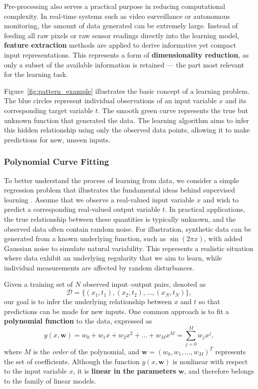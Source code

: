 \documentclass[12pt]{article}
\begin{document}
Pre-processing also serves a practical purpose in reducing computational complexity. 
In real-time systems such as video surveillance or autonomous monitoring, the amount of data generated can be extremely large. 
Instead of feeding all raw pixels or raw sensor readings directly into the learning model, \textbf{feature extraction} methods are applied to derive informative yet compact input representations. 
This represents a form of \textbf{dimensionality reduction}, as only a subset of the available information is retained — the part most relevant for the learning task.

Figure~\ref{fig:pattern_example} illustrates the basic concept of a learning problem. 
The blue circles represent individual observations of an input variable \(x\) and its corresponding target variable \(t\). 
The smooth green curve represents the true but unknown function that generated the data. 
The learning algorithm aims to infer this hidden relationship using only the observed data points, allowing it to make predictions for new, unseen inputs. 

\subsubsection*{Polynomial Curve Fitting}

To better understand the process of learning from data, we consider a simple regression problem that illustrates the fundamental ideas behind supervised learning \cite{bishop2006pattern}. 
Assume that we observe a real-valued input variable \(x\) and wish to predict a corresponding real-valued output variable \(t\). 
In practical applications, the true relationship between these quantities is typically unknown, and the observed data often contain random noise. 
For illustration, synthetic data can be generated from a known underlying function, such as \(\sin(2\pi x)\), with added Gaussian noise to simulate natural variability. 
This represents a realistic situation where data exhibit an underlying regularity that we aim to learn, while individual measurements are affected by random disturbances.

Given a training set of \(N\) observed input--output pairs, denoted as 
\[
\mathcal{D} = \{ (x_1, t_1), (x_2, t_2), \dots, (x_N, t_N) \},
\]
our goal is to infer the underlying relationship between \(x\) and \(t\) so that predictions can be made for new inputs. 
One common approach is to fit a \textbf{polynomial function} to the data, expressed as
\[
y(x, \mathbf{w}) = w_0 + w_1x + w_2x^2 + \dots + w_Mx^M = \sum_{j=0}^{M} w_j x^j,
\]
where \(M\) is the \textit{order} of the polynomial, and \(\mathbf{w} = (w_0, w_1, \dots, w_M)^{T}\) represents the set of coefficients. 
Although the function \(y(x, \mathbf{w})\) is nonlinear with respect to the input variable \(x\), it is \textbf{linear in the parameters} \(\mathbf{w}\), and therefore belongs to the family of linear models.
\end{document}
